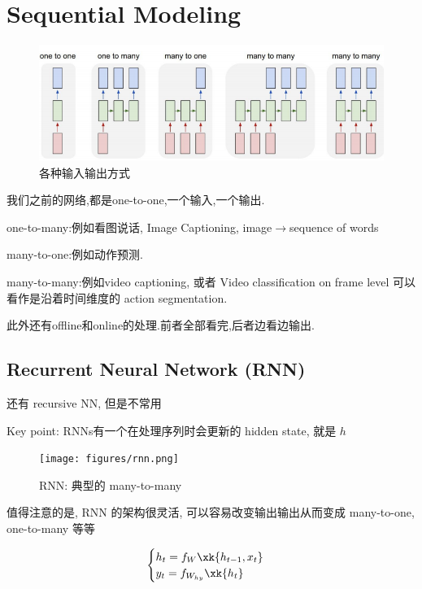 \section{Sequential Modeling}

	\begin{figure}[htbp]
		\centering
		\includegraphics[scale=0.65]{figures/rnn-seqdata.png}
		\caption{各种输入输出方式}
	\end{figure}

	我们之前的网络,都是one-to-one,一个输入,一个输出.
	
	one-to-many:例如看图说话, Image Captioning, image$\rightarrow$sequence of words
	
	many-to-one:例如动作预测.
	
	many-to-many:例如video captioning, 或者 Video classification on frame level 可以看作是沿着时间维度的 action segmentation.

	此外还有offline和online的处理.前者全部看完,后者边看边输出.
	
	\subsection{Recurrent Neural Network (RNN)}
	
	还有 recursive NN, 但是不常用

	Key point: RNNs有一个在处理序列时会更新的 hidden state, 就是 $h$

	\begin{figure}[htbp]
		\centering
		\texttt{[image: figures/rnn.png]}
		\caption{RNN: 典型的 many-to-many}
	\end{figure}

	值得注意的是, RNN 的架构很灵活, 可以容易改变输出输出从而变成 many-to-one, one-to-many 等等

	\begin{equation}
		\begin{cases}
			h_t = f_W\xk{h_{t-1}, x_t}
			\\
			y_t = f_{W_{hy}}\xk{h_t}
		\end{cases}
	\end{equation}

